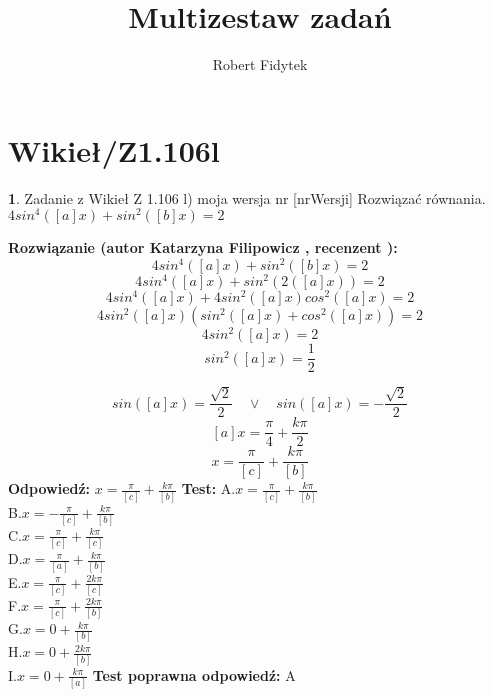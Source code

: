 \documentclass[12pt, a4paper]{article}
\title{Multizestaw zadań}
\author{Robert Fidytek}
\date{}
\theoremstyle{definition} %
\newtheorem{zad}{}
\newcommand{\kategoria}[1]{\section{#1}} %
\newcommand{\zadStart}[1]{\begin{zad}#1\newline} %
\newcommand{\zadStop}{\end{zad}}   %
\newcommand{\rozwStart}[2]{\noindent \textbf{Rozwiązanie (autor #1 , recenzent #2): }\newline} %
\newcommand{\rozwStop}{\newline}                                            %
\newcommand{\odpStart}{\noindent \textbf{Odpowiedź:}\newline}    %
\newcommand{\odpStop}{\newline}                                             %
\newcommand{\testStart}{\noindent \textbf{Test:}\newline} %
\newcommand{\testStop}{\newline} %
\newcommand{\kluczStart}{\noindent \textbf{Test poprawna odpowiedź:}\newline} %
\newcommand{\kluczStop}{\newline} %
\begin{document}
\maketitle


\kategoria{Wikieł/Z1.106l}
\zadStart{Zadanie z Wikieł Z 1.106 l) moja wersja nr [nrWersji]}
Rozwiązać równania.\\
 $4sin^4([a]x)+sin^2([b]x)=2$
\zadStop
\rozwStart{Katarzyna Filipowicz}{}
$$4sin^4([a]x)+sin^2([b]x)=2$$
$$
4sin^4([a]x)+sin^2(2([a]x))=2
$$ $$
4sin^4([a]x)+4sin^2([a]x)cos^2([a]x)=2
$$ $$
4sin^2([a]x)(sin^2([a]x)+cos^2([a]x))=2
$$ $$
4sin^2([a]x)=2
$$ $$
sin^2([a]x)=\frac{1}{2}
$$

 $$
sin([a]x)=\frac{\sqrt{2}}{2}\quad \vee \quad sin([a]x)=-\frac{\sqrt{2}}{2}
$$ $$
[a]x=\frac{\pi}{4}+\frac{k\pi}{2}
$$ $$
x=\frac{\pi}{[c]}+\frac{k\pi}{[b]}
$$
\rozwStop
\odpStart
$x=\frac{\pi}{[c]}+\frac{k\pi}{[b]}$
\odpStop
\testStart
A.$x=\frac{\pi}{[c]}+\frac{k\pi}{[b]}$\\
B.$x=-\frac{\pi}{[c]}+\frac{k\pi}{[b]}$\\
C.$x=\frac{\pi}{[c]}+\frac{k\pi}{[c]}$\\
D.$x=\frac{\pi}{[a]}+\frac{k\pi}{[b]}$\\
E.$x=\frac{\pi}{[c]}+\frac{2k\pi}{[c]}$\\
F.$x=\frac{\pi}{[c]}+\frac{2k\pi}{[b]}$\\
G.$x=0+\frac{k\pi}{[b]}$\\
H.$x=0+\frac{2k\pi}{[b]}$\\
I.$x=0+\frac{k\pi}{[a]}$
\testStop
\kluczStart
A
\kluczStop
\end{document}
